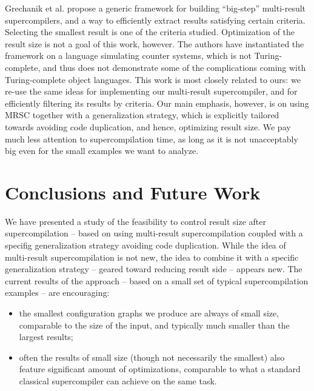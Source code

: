 \documentclass[submission,copyright,creativecommons]{eptcs}
\begin{document}
Grechanik et al. \cite{Romanenko2014StagedMRSC} propose a generic framework for building ``big-step''
multi-result supercompilers, and a way to efficiently extract results satisfying certain criteria.
Selecting the smallest result is one of the criteria studied.
Optimization of the result size is not a goal of this work, however.
The authors have instantiated the framework on a language simulating counter systems, which
is not Turing-complete, and thus does not demonstrate some of the complications
coming with Turing-complete object languages.
This work is most closely related to ours: we re-use the same ideas for implementing
our multi-result supercompiler, and for efficiently filtering its results by criteria.
Our main emphasis, however, is on using MRSC together with a generalization strategy, which
is explicitly tailored towards avoiding code duplication, and hence, optimizing result size.
We pay much less attention to supercompilation time, as long as it is not unacceptably big
even for the small examples we want to analyze.

\section{Conclusions and Future Work}

We have presented a study of the feasibility to control result size after supercompilation
-- based on using multi-result supercompilation coupled with a specifig generalization
strategy avoiding code duplication.
While the idea of multi-result supercompilation is not new, the idea to combine it
with a specific generalization strategy -- geared toward reducing result side --
appears new.
The current results of the approach -- based on a small set of typical supercompilation examples --
are encouraging:
\begin{itemize}
  \item the smallest configuration graphs we produce are always of small size, comparable
    to the size of the input, and typically much smaller than the largest results;
  \item often the results of small size (though not necessarily the smallest) also feature 
    significant amount of optimizations, comparable to what a standard classical supercompiler
    can achieve on the same task.
\end{itemize}
\end{document}
